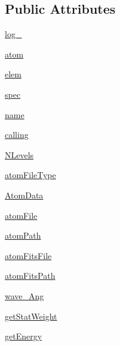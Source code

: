 \subsection*{Public Attributes}
\begin{DoxyCompactItemize}
\item 
\hyperlink{classpyneb_1_1core_1_1pynebcore_1_1_atom_a9e2e5b5402bb9cf14c1b08684bccbf6b}{log\-\_\-}
\item 
\hyperlink{classpyneb_1_1core_1_1pynebcore_1_1_atom_a192f3e20446d7fba81d789bc705d6c71}{atom}
\item 
\hyperlink{classpyneb_1_1core_1_1pynebcore_1_1_atom_ae722bd0e35e1c8cdc0018d56c34171cf}{elem}
\item 
\hyperlink{classpyneb_1_1core_1_1pynebcore_1_1_atom_a02c0f7146a2f5b8eac765a453c763797}{spec}
\item 
\hyperlink{classpyneb_1_1core_1_1pynebcore_1_1_atom_aa8b43e1441b80824954f2f2fac4f2eba}{name}
\item 
\hyperlink{classpyneb_1_1core_1_1pynebcore_1_1_atom_a373b7735acf4f528b54bddf373ad67a1}{calling}
\item 
\hyperlink{classpyneb_1_1core_1_1pynebcore_1_1_atom_a6b43c1e6431a6786c1b4267f704fb4e8}{N\-Levels}
\item 
\hyperlink{classpyneb_1_1core_1_1pynebcore_1_1_atom_acb3c11139568e31337ac4c26d6aa57b8}{atom\-File\-Type}
\item 
\hyperlink{classpyneb_1_1core_1_1pynebcore_1_1_atom_a7246a8b1ce71eb9d38f580a6ca9fe09e}{Atom\-Data}
\item 
\hyperlink{classpyneb_1_1core_1_1pynebcore_1_1_atom_a0d74c41b1e0ac1a9cd5591467769d07f}{atom\-File}
\item 
\hyperlink{classpyneb_1_1core_1_1pynebcore_1_1_atom_a8c2ddffd0cd3f7ce2a089e87746e909f}{atom\-Path}
\item 
\hyperlink{classpyneb_1_1core_1_1pynebcore_1_1_atom_ada464bba6971f03f7fc1a51228b35f5d}{atom\-Fits\-File}
\item 
\hyperlink{classpyneb_1_1core_1_1pynebcore_1_1_atom_a8919c61156a1cbc2cfac6a6d9ee3b1f7}{atom\-Fits\-Path}
\item 
\hyperlink{classpyneb_1_1core_1_1pynebcore_1_1_atom_a044e1349bb63766a5f3d25fbf04b5c2c}{wave\-\_\-\-Ang}
\item 
\hyperlink{classpyneb_1_1core_1_1pynebcore_1_1_atom_a0f2483487115f19556586b9e422bd5fb}{get\-Stat\-Weight}
\item 
\hyperlink{classpyneb_1_1core_1_1pynebcore_1_1_atom_a9940acb2999e864edf9761d822e65d7f}{get\-Energy}
\item 

\end{DoxyCompactItemize}
